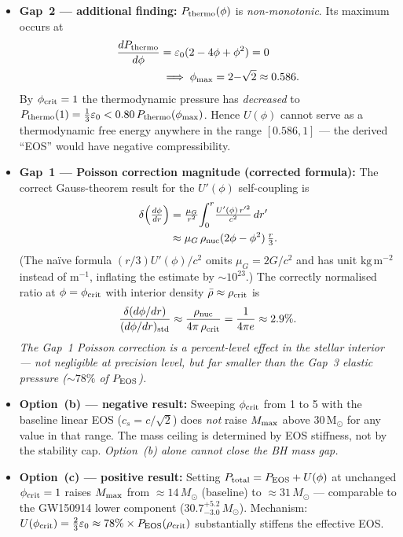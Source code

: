 \documentclass[10pt,twocolumn]{article}
\begin{document}
\begin{itemize}
  \item \textbf{Gap~2 — additional finding:}
    $P_{\rm thermo}(\phi)$ is \emph{non-monotonic}.  Its maximum occurs at
    \begin{align*}
      \frac{dP_{\rm thermo}}{d\phi}
      &= \varepsilon_0(2-4\phi+\phi^2) = 0 \\
      &\;\Longrightarrow\;
      \phi_{\rm max} = 2{-}\sqrt{2} \approx 0.586.
    \end{align*}
    By $\phi_{\rm crit}=1$ the thermodynamic pressure has \emph{decreased}
    to $P_{\rm thermo}(1)=\tfrac{1}{3}\varepsilon_0 < 0.80\,P_{\rm thermo}(\phi_{\rm max})$.
    Hence $U(\phi)$ cannot serve as a thermodynamic free energy anywhere
    in the range $[0.586, 1]$ — the derived ``EOS'' would have negative
    compressibility.

  \item \textbf{Gap~1 — Poisson correction magnitude (corrected formula):}
    The correct Gauss-theorem result for the $U'(\phi)$ self-coupling is
    \begin{align*}
      \delta\!\left(\tfrac{d\phi}{dr}\right)
      &= \tfrac{\mu_G}{r^2}\!\int_0^r\!\tfrac{U'(\phi)\,r'^2}{c^2}\,dr'
      \\
      &\approx \mu_G\,\rho_{\rm nuc}(2\phi-\phi^2)\,\tfrac{r}{3}.
    \end{align*}
    (The na\"ive formula $(r/3)U'(\phi)/c^2$ omits $\mu_G=2G/c^2$ and has
    unit $\mathrm{kg\,m^{-2}}$ instead of $\mathrm{m^{-1}}$, inflating the
    estimate by $\sim 10^{23}$.)
    The correctly normalised ratio at $\phi=\phi_{\rm crit}$ with interior
    density $\bar\rho\approx\rho_{\rm crit}$ is
    \[
      \frac{\delta(d\phi/dr)}{(d\phi/dr)_{\rm std}}
      \approx \frac{\rho_{\rm nuc}}{4\pi\,\rho_{\rm crit}}
      = \frac{1}{4\pi e} \approx 2.9\%.
    \]
    \emph{The Gap~1 Poisson correction is a percent-level effect in the
    stellar interior — not negligible at precision level, but far smaller
    than the Gap~3 elastic pressure ($\sim 78\%$ of $P_{\rm EOS}$).}

  \item \textbf{Option~(b) — negative result:}
    Sweeping $\phi_{\rm crit}$ from 1 to 5 with the baseline linear EOS
    ($c_s = c/\sqrt{2}$) does \emph{not} raise $M_{\rm max}$ above 30\,M$_\odot$
    for any value in that range.  The mass ceiling is determined by EOS
    stiffness, not by the stability cap.  \emph{Option~(b) alone cannot
    close the BH mass gap.}

  \item \textbf{Option~(c) — positive result:}
    Setting $P_{\rm total}=P_{\rm EOS}+U(\phi)$ at unchanged $\phi_{\rm crit}=1$
    raises $M_{\rm max}$ from ${\approx}14\,M_\odot$ (baseline) to
    ${\approx}31\,M_\odot$ — comparable to the GW150914 lower component
    ($30.7^{+5.2}_{-3.0}\,M_\odot$).  Mechanism: $U(\phi_{\rm crit})=
    \tfrac{2}{3}\varepsilon_0 \approx 78\%\times P_{\rm EOS}(\rho_{\rm crit})$
    substantially stiffens the effective EOS.
\end{itemize}
\end{document}
